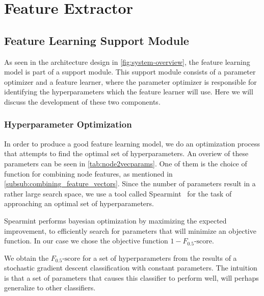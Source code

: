 \section{Feature Extractor}\label{feature_extractor}





\subsection{Feature Learning Support Module}
As seen in the architecture design in \cref{fig:system-overview}, the feature learning model is part of a support module. This support module consists of a parameter optimizer and a feature learner, where the parameter optimizer is responsible for identifying the hyperparameters which the feature learner will use. Here we will discuss the development of these two components.

\subsubsection{Hyperparameter Optimization}\label{sec:hyperopt}
In order to produce a good feature learning model, we do an optimization process that attempts to find the optimal set of hyperparameters. An overiew of these parameters can be seen in \cref{tab:node2vecparams}. One of them is the choice of function for combining node features, as mentioned in \cref{subsub:combining_feature_vectors}. Since the number of parameters result in a rather large search space, we use a tool called Spearmint~\cite{snoek2012practical} for the task of approaching an optimal set of hyperparameters.

Spearmint performs bayesian optimization by maximizing the expected improvement, to efficiently search for parameters that will minimize an objective function. In our case we chose the objective function $1- F_{0.5}\text{-score}$.

We obtain the $F_{0.5}\text{-score}$ for a set of hyperparameters from the results of a stochastic gradient descent classification with constant parameters. The intuition is that a set of parameters that causes this classifier to perform well, will perhaps generalize to other classifiers.

